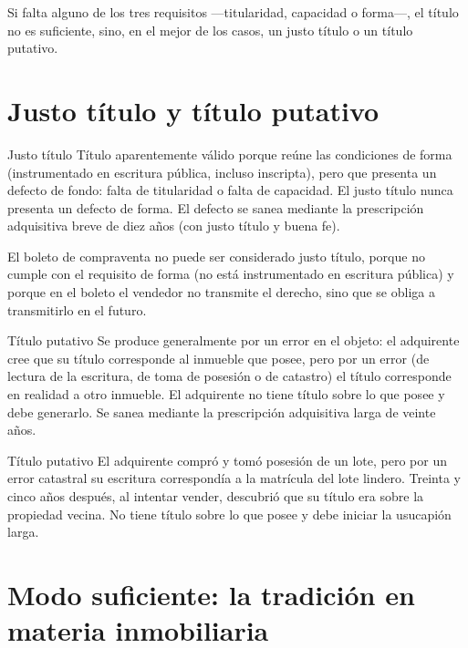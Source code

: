 \documentclass[12pt,oneside]{book}
\begin{document}
Si falta alguno de los tres requisitos —titularidad, capacidad o forma—, el título no es suficiente, sino, en el mejor de los casos, un justo título o un título putativo.

\section{Justo título y título putativo}

\begin{definition}{Justo título}
Título aparentemente válido porque reúne las condiciones de forma (instrumentado en escritura pública, incluso inscripta), pero que presenta un defecto de fondo: falta de titularidad o falta de capacidad. El justo título nunca presenta un defecto de forma. El defecto se sanea mediante la prescripción adquisitiva breve de diez años (con justo título y buena fe).
\end{definition}

\begin{important}
El boleto de compraventa no puede ser considerado justo título, porque no cumple con el requisito de forma (no está instrumentado en escritura pública) y porque en el boleto el vendedor no transmite el derecho, sino que se obliga a transmitirlo en el futuro.
\end{important}

\begin{definition}{Título putativo}
Se produce generalmente por un error en el objeto: el adquirente cree que su título corresponde al inmueble que posee, pero por un error (de lectura de la escritura, de toma de posesión o de catastro) el título corresponde en realidad a otro inmueble. El adquirente no tiene título sobre lo que posee y debe generarlo. Se sanea mediante la prescripción adquisitiva larga de veinte años.
\end{definition}

\begin{example}{Título putativo}
El adquirente compró y tomó posesión de un lote, pero por un error catastral su escritura correspondía a la matrícula del lote lindero. Treinta y cinco años después, al intentar vender, descubrió que su título era sobre la propiedad vecina. No tiene título sobre lo que posee y debe iniciar la usucapión larga.
\end{example}

\section{Modo suficiente: la tradición en materia inmobiliaria}
\end{document}

